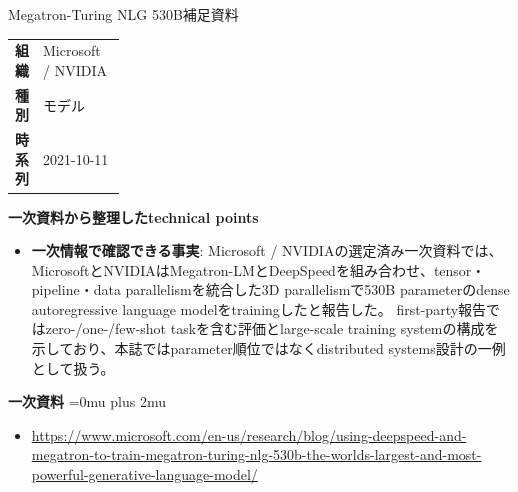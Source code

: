 \begin{technicalnote}{Megatron-Turing NLG 530B}{補足資料}
\begingroup
\begin{tabularx}{\linewidth}{@{}>{\bfseries}p{0.22\linewidth}X@{}}
組織 & Microsoft / NVIDIA \\
種別 & モデル \\
時系列 & 2021-10-11 \\
\end{tabularx}
\smallskip
\begin{minipage}{\linewidth}
{\bfseries 一次資料から整理したtechnical points}
\begin{itemize}[leftmargin=1.5em,itemsep=0.35em]
\item \textbf{一次情報で確認できる事実}: Microsoft / NVIDIAの選定済み一次資料では、MicrosoftとNVIDIAはMegatron-LMとDeepSpeedを組み合わせ、tensor・pipeline・data parallelismを統合した3D parallelismで530B parameterのdense autoregressive language modelをtrainingしたと報告した。 first-party報告ではzero-/one-/few-shot taskを含む評価とlarge-scale training systemの構成を示しており、本誌ではparameter順位ではなくdistributed systems設計の一例として扱う。
\end{itemize}
\begin{minipage}{\linewidth}
\begin{samepage}
{\bfseries 一次資料}
\begingroup\sloppy
\Urlmuskip=0mu plus 2mu\relax
\begin{itemize}[leftmargin=1.5em,itemsep=0.25em]
\item {\scriptsize\url{https://www.microsoft.com/en-us/research/blog/using-deepspeed-and-megatron-to-train-megatron-turing-nlg-530b-the-worlds-largest-and-most-powerful-generative-language-model/}}
\end{itemize}
\endgroup
\end{samepage}
\end{minipage}
\end{minipage}
\endgroup
\end{technicalnote}
\medskip

